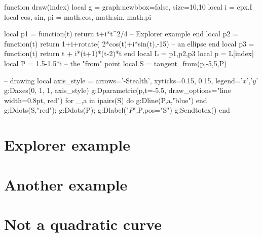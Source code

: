 \documentclass[varwidth,border = 3pt]{standalone}
\begin{document}
\begin{luacode*}
function draw(index)
local g = graph:new{bbox=false, size={10,10}}
local i = cpx.I
local cos, sin, pi = math.cos, math.sin, math.pi

local p1 = function(t)
    return t+i*t^2/4 -- Explorer example
end
local p2 = function(t)
    return  1+i+rotate( 2*cos(t)+i*sin(t),-15)  -- an ellipse
end
local p3 = function(t)
    return  t + i*(t+1)*(t-2)*t
end
local L = {p1,p2,p3}
local p = L[index]
local P = 1.5-1.5*i -- the "from" point
local S = tangent_from(p,-5,5,P)

-- drawing
local axis_style = {
  arrows='-Stealth',
  xyticks={0.15, 0.15},
  legend={'$x$','$y$'} 
}
g:Daxes({0, 1, 1}, axis_style)
g:Dparametric(p,{t={-5,5}, draw_options="line width=0.8pt, red"})
for _,a in ipairs(S) do
    g:Dline(P,a,"blue")
end
g:Ddots(S,"red"); g:Ddots(P); g:Dlabel("$P$",P,{pos="S"})
g:Sendtotex()
end
\end{luacode*}

\centering

\section*{Explorer example}

%

\section*{Another example}

%

\section*{Not a quadratic curve}

%
\end{document}
